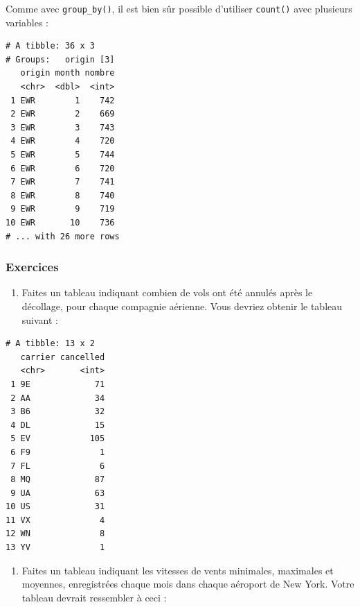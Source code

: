 \documentclass[a4paperpaper,]{article}
\newenvironment{Shaded}{\begin{snugshade}}{\end{snugshade}}
\newcommand{\DataTypeTok}[1]{\textcolor[rgb]{0.00,0.34,0.68}{#1}}
\newcommand{\KeywordTok}[1]{\textcolor[rgb]{0.12,0.11,0.11}{\textbf{#1}}}
\newcommand{\NormalTok}[1]{\textcolor[rgb]{0.12,0.11,0.11}{#1}}
\newcommand{\OperatorTok}[1]{\textcolor[rgb]{0.12,0.11,0.11}{#1}}
\newcommand{\StringTok}[1]{\textcolor[rgb]{0.75,0.01,0.01}{#1}}
\providecommand{\tightlist}{%
  \setlength{\itemsep}{0pt}\setlength{\parskip}{0pt}}
\begin{document}
Comme avec \texttt{group\_by()}, il est bien sûr possible d'utiliser \texttt{count()} avec plusieurs variables :

\begin{Shaded}
\end{Shaded}

\begin{verbatim}
# A tibble: 36 x 3
# Groups:   origin [3]
   origin month nombre
   <chr>  <dbl>  <int>
 1 EWR        1    742
 2 EWR        2    669
 3 EWR        3    743
 4 EWR        4    720
 5 EWR        5    744
 6 EWR        6    720
 7 EWR        7    741
 8 EWR        8    740
 9 EWR        9    719
10 EWR       10    736
# ... with 26 more rows
\end{verbatim}

\hypertarget{exercices-9}{%
\subsubsection{Exercices}\label{exercices-9}}

\begin{enumerate}
\def\labelenumi{\arabic{enumi}.}
\tightlist
\item
  Faites un tableau indiquant combien de vols ont été annulés après le décollage, pour chaque compagnie aérienne. Vous devriez obtenir le tableau suivant :
\end{enumerate}

\begin{verbatim}
# A tibble: 13 x 2
   carrier cancelled
   <chr>       <int>
 1 9E             71
 2 AA             34
 3 B6             32
 4 DL             15
 5 EV            105
 6 F9              1
 7 FL              6
 8 MQ             87
 9 UA             63
10 US             31
11 VX              4
12 WN              8
13 YV              1
\end{verbatim}

\begin{enumerate}
\def\labelenumi{\arabic{enumi}.}
\setcounter{enumi}{1}
\tightlist
\item
  Faites un tableau indiquant les vitesses de vents minimales, maximales et moyennes, enregistrées chaque mois dans chaque aéroport de New York. Votre tableau devrait ressembler à ceci :
\end{enumerate}
\end{document}
